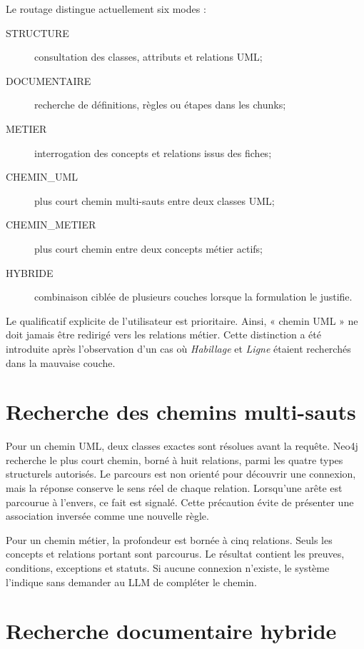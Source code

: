 Le routage distingue actuellement six modes :

\begin{description}
  \item[STRUCTURE] consultation des classes, attributs et relations UML;
  \item[DOCUMENTAIRE] recherche de définitions, règles ou étapes dans les chunks;
  \item[METIER] interrogation des concepts et relations issus des fiches;
  \item[CHEMIN\_UML] plus court chemin multi-sauts entre deux classes UML;
  \item[CHEMIN\_METIER] plus court chemin entre deux concepts métier actifs;
  \item[HYBRIDE] combinaison ciblée de plusieurs couches lorsque la formulation le justifie.
\end{description}

Le qualificatif explicite de l'utilisateur est prioritaire. Ainsi, « chemin UML » ne doit
jamais être redirigé vers les relations métier. Cette distinction a été introduite après
l'observation d'un cas où \emph{Habillage} et \emph{Ligne} étaient recherchés dans la
mauvaise couche.

\section{Recherche des chemins multi-sauts}

Pour un chemin UML, deux classes exactes sont résolues avant la requête. Neo4j recherche
le plus court chemin, borné à huit relations, parmi les quatre types structurels autorisés.
Le parcours est non orienté pour découvrir une connexion, mais la réponse conserve le sens
réel de chaque relation. Lorsqu'une arête est parcourue à l'envers, ce fait est signalé.
Cette précaution évite de présenter une association inversée comme une nouvelle règle.

Pour un chemin métier, la profondeur est bornée à cinq relations. Seuls les concepts et
relations portant  sont parcourus. Le résultat contient les preuves,
conditions, exceptions et statuts. Si aucune connexion n'existe, le système l'indique sans
demander au LLM de compléter le chemin.

\section{Recherche documentaire hybride}

